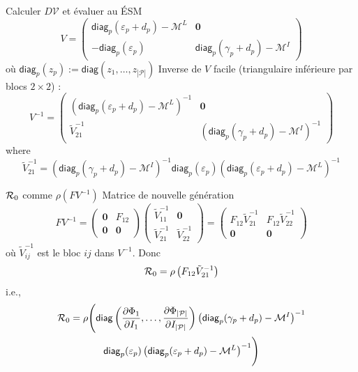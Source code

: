 \documentclass[aspectratio=169]{beamer}\usepackage[]{graphicx}\usepackage[]{xcolor}
\begin{document}
\begin{frame}{Calculer $D\mathcal{V}$ et évaluer au ÉSM}
$$
V=
\begin{pmatrix}
\mathsf{diag}_p(\varepsilon_p+d_p)-\mathcal{M}^L & \mathbf{0} \\
-\mathsf{diag}_p(\varepsilon_p) & \mathsf{diag}_p(\gamma_p+d_p)-\mathcal{M}^I
\end{pmatrix}
$$
où $\mathsf{diag}_p(z_p):=\mathsf{diag}(z_1,\ldots,z_{|\mathcal{P}|})$
\vfill
Inverse de $V$ facile (triangulaire inférieure par blocs $2\times 2$) :
$$
V^{-1}
=
\begin{pmatrix}
\left(\mathsf{diag}_p(\varepsilon_p+d_p)-\mathcal{M}^L\right)^{-1} & \mathbf{0} \\
\tilde V_{21}^{-1} & \left(\mathsf{diag}_p(\gamma_p+d_p)-\mathcal{M}^I\right)^{-1}
\end{pmatrix}
$$
where
\[
	\tilde V_{21}^{-1}=
	\left(\mathsf{diag}_p(\gamma_p+d_p)-\mathcal{M}^I\right)^{-1}		
	\mathsf{diag}_p(\varepsilon_p)
	\left(\mathsf{diag}_p(\varepsilon_p+d_p)-\mathcal{M}^L\right)^{-1}
\]
\end{frame}

\begin{frame}{$\mathcal{R}_0$ comme $\rho(FV^{-1})$}
Matrice de nouvelle génération
$$
FV^{-1}=
\begin{pmatrix}
\mathbf{0} & F_{12} \\
\mathbf{0} & \mathbf{0}
\end{pmatrix}
\begin{pmatrix}
\tilde V_{11}^{-1} & \mathbf{0} \\
\tilde V_{21}^{-1} & \tilde V_{22}^{-1}
\end{pmatrix}
=
\begin{pmatrix}
F_{12}\tilde V_{21}^{-1} & F_{12}\tilde V_{22}^{-1} \\
\mathbf{0} & \mathbf{0}
\end{pmatrix}
$$
où $\tilde V_{ij}^{-1}$ est le bloc $ij$ dans $V^{-1}$. Donc
$$
\mathcal{R}_0=\rho\left(F_{12}\tilde{V}_{21}^{-1}\right)
$$
i.e.,
\begin{multline*}
	\mathcal{R}_0=\rho\Biggl(
		\mathsf{diag}
		\left(
		\frac{\partial\Phi_1}{\partial I_1},\ldots,
		\frac{\partial\Phi_{|\mathcal{P}|}}{\partial I_{|\mathcal{P}|}}
		\right)
		\left(\mathsf{diag}_p(\gamma_p+d_p)-\mathcal{M}^I\right)^{-1}
		\\ 
		\mathsf{diag}_p(\varepsilon_p)
		\left(\mathsf{diag}_p(\varepsilon_p+d_p)-\mathcal{M}^L\right)^{-1} 
		\Biggr)			
\end{multline*}
\end{frame}
\end{document}
